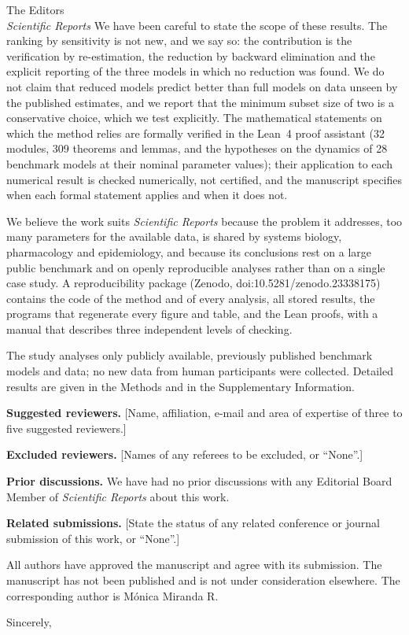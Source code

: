 \documentclass[11pt]{letter}
\begin{document}
\begin{letter}{The Editors\\\emph{Scientific Reports}}
We have been careful to state the scope of these results. The ranking by sensitivity is not new, and we say so: the contribution is the verification by re-estimation, the reduction by backward elimination and the explicit reporting of the three models in which no reduction was found. We do not claim that reduced models predict better than full models on data unseen by the published estimates, and we report that the minimum subset size of two is a conservative choice, which we test explicitly. The mathematical statements on which the method relies are formally verified in the Lean~4 proof assistant (32 modules, 309 theorems and lemmas, and the hypotheses on the dynamics of 28 benchmark models at their nominal parameter values); their application to each numerical result is checked numerically, not certified, and the manuscript specifies when each formal statement applies and when it does not.

We believe the work suits \emph{Scientific Reports} because the problem it addresses, too many parameters for the available data, is shared by systems biology, pharmacology and epidemiology, and because its conclusions rest on a large public benchmark and on openly reproducible analyses rather than on a single case study. A reproducibility package (Zenodo, doi:10.5281/zenodo.23338175) contains the code of the method and of every analysis, all stored results, the programs that regenerate every figure and table, and the Lean proofs, with a manual that describes three independent levels of checking.

The study analyses only publicly available, previously published benchmark models and data; no new data from human participants were collected. Detailed results are given in the Methods and in the Supplementary Information.

\textbf{Suggested reviewers.} [Name, affiliation, e-mail and area of expertise of three to five suggested reviewers.]

\textbf{Excluded reviewers.} [Names of any referees to be excluded, or ``None''.]

\textbf{Prior discussions.} We have had no prior discussions with any Editorial Board Member of \emph{Scientific Reports} about this work.

\textbf{Related submissions.} [State the status of any related conference or journal submission of this work, or ``None''.]

All authors have approved the manuscript and agree with its submission. The manuscript has not been published and is not under consideration elsewhere. The corresponding author is M\'onica Miranda R.

\setlength{\longindentation}{0pt}\setlength{\indentedwidth}{\textwidth}
\closing{Sincerely,}

\end{letter}
\end{document}
